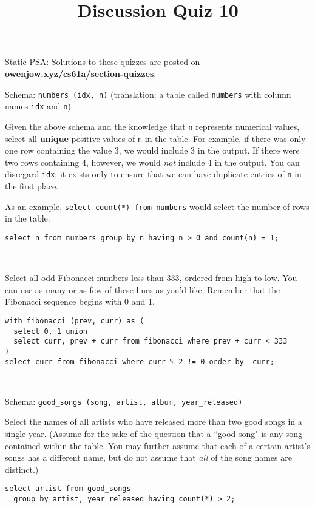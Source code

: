 \documentclass[twoside]{article}
\title{\sc Discussion Quiz 10 \solution{Solutions}}
\begin{document}
\thispagestyle{empty}
\maketitle

\hfill Static PSA: Solutions to these quizzes are posted on \textbf{\href{http://owenjow.xyz/cs61a/section-quizzes}{owenjow.xyz/cs61a/section-quizzes}}.

\begin{enumerate}

Schema: \texttt{numbers (idx, n)} (translation: a table called \texttt{numbers} with column names \texttt{idx} and \texttt{n})

Given the above schema and the knowledge that \texttt{n} represents numerical values, select all \textbf{unique} positive values of \texttt{n} in the table. For example, if there was only one row containing the value 3, we would include 3 in the output. If there were two rows containing 4, however, we would \textit{not} include 4 in the output. You can disregard \texttt{idx}; it exists only to ensure that we can have duplicate entries of \texttt{n} in the first place.

As an example, \texttt{select count(*) from numbers} would select the number of rows in the table.\\

\begin{lstlisting}
select n from numbers group by n having n > 0 and count(n) = 1;
\end{lstlisting}

~


Select all odd Fibonacci numbers less than 333, ordered from high to low. You can use as many or as few of these lines as you'd like. Remember that the Fibonacci sequence begins with 0 and 1.\\

\begin{lstlisting}
with fibonacci (prev, curr) as (
  select 0, 1 union
  select curr, prev + curr from fibonacci where prev + curr < 333
)
select curr from fibonacci where curr % 2 != 0 order by -curr;
\end{lstlisting}

~


Schema: \texttt{good\_songs (song, artist, album, year\_released)}

Select the names of all artists who have released more than two good songs in a single year. (Assume for the sake of the question that a ``good song" is any song contained within the table. You may further assume that each of a certain artist's songs has a different name, but do not assume that \textit{all} of the song names are distinct.)\\

\begin{lstlisting}
select artist from good_songs
  group by artist, year_released having count(*) > 2;
\end{lstlisting}

\end{enumerate}
\end{document}

